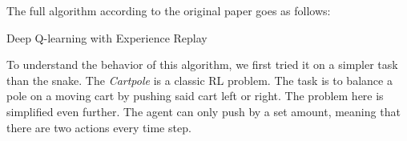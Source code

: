 The full algorithm according to the original paper goes as follows:
\begin{algorithm}[H]
  \caption{Deep Q-learning with Experience Replay}
  \label{alg:vanilla_dqn}
  \begin{algorithmic}[1]
		\EndFor
	\EndFor
  \end{algorithmic}
\end{algorithm}
To understand the behavior of this algorithm, we first tried it on a simpler task than the snake.
The \emph{Cartpole} is a classic RL problem.
The task is to balance a pole on a moving cart by pushing said cart left or right.
The problem here is simplified even further.
The agent can only push by a set amount, meaning that there are two actions every time step.


